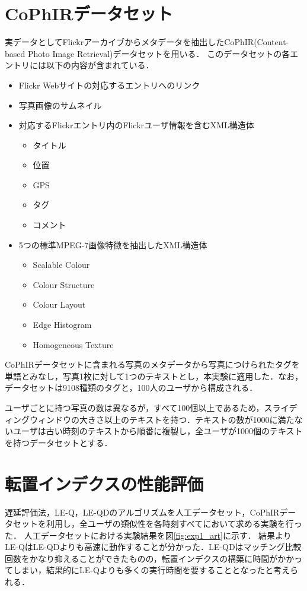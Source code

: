 \section{CoPhIRデータセット}
実データとしてFlickrアーカイブからメタデータを抽出したCoPhIR(Content-based Photo Image Retrieval)\cite{CoPhIR}\cite{2009}データセットを用いる．
このデータセットの各エントリには以下の内容が含まれている．
\begin{itemize}
    \item Flickr Webサイトの対応するエントリへのリンク
    \item 写真画像のサムネイル
    \item 対応するFlickrエントリ内のFlickrユーザ情報を含むXML構造体
    \begin{itemize}
        \item タイトル
        \item 位置
        \item GPS
        \item タグ
        \item コメント
    \end{itemize}
    \item 5つの標準MPEG-7画像特徴を抽出したXML構造体
    \begin{itemize}
        \item Scalable Colour
        \item Colour Structure
        \item Colour Layout
        \item Edge Histogram
        \item Homogeneous Texture
    \end{itemize}
\end{itemize}


CoPhIRデータセットに含まれる写真のメタデータから写真につけられたタグを単語とみなし，写真1枚に対して1つのテキストとし，本実験に適用した．なお，データセットは9108種類のタグと，100人のユーザから構成される．

ユーザごとに持つ写真の数は異なるが，すべて100個以上であるため，スライディングウィンドウの大きさ以上のテキストを持つ．テキストの数が1000に満たないユーザは古い時刻のテキストから順番に複製し，全ユーザが1000個のテキストを持つデータセットとする．


\section{転置インデクスの性能評価}
\label{exp1}
遅延評価法，LE-Q，LE-QDのアルゴリズムを人工データセット，CoPhIRデータセットを利用し，全ユーザの類似性を各時刻すべてにおいて求める実験を行った．
人工データセットにおける実験結果を図\ref{fig:exp1_art}に示す．
結果よりLE-QはLE-QDよりも高速に動作することが分かった．LE-QDはマッチング比較回数をかなり抑えることができたものの，転置インデクスの構築に時間がかかってしまい，結果的にLE-Qよりも多くの実行時間を要することとなったと考えられる．

